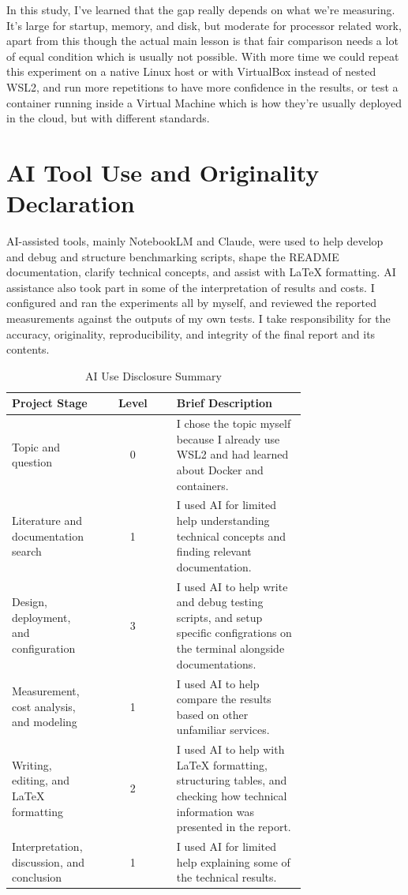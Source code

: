 \documentclass[conference,a4paper]{IEEEtran}
\begin{document}
In this study, I’ve learned that the gap really depends on what we’re measuring. It’s large for startup, memory, and disk, but moderate for processor related work, apart from this though the actual main lesson is that fair comparison needs a lot of equal condition which is usually not possible. With more time we could repeat this experiment on a native Linux host or with VirtualBox instead of nested WSL2, and run more repetitions to have more confidence in the results, or test a container running inside a Virtual Machine which is how they’re usually deployed in the cloud, but with different standards.

\section*{AI Tool Use and Originality Declaration}
\label{sec:ai_declaration}
AI-assisted tools, mainly NotebookLM and Claude, were used to help develop and debug and structure benchmarking scripts, shape the README documentation, clarify technical concepts, and assist with LaTeX formatting. AI assistance also took part in some of the interpretation of results and costs. I configured and ran the experiments all by myself, and reviewed the reported measurements against the outputs of my own tests. I take responsibility for the accuracy, originality, reproducibility, and integrity of the final report and its contents.

\begin{table}[htbp]
	\caption{AI Use Disclosure Summary}
	\label{tab:ai_use}
	\centering
	\footnotesize
	\begin{tabular}{|p{0.30\linewidth}|c|p{0.44\linewidth}|}
		\hline
		\textbf{Project Stage} & \textbf{Level} & \textbf{Brief Description} \\
		\hline
		Topic and question & 0 & I chose the topic myself because I already use WSL2 and had learned about Docker and containers. \\
		\hline
		Literature and documentation search & 1 & I used AI for limited help understanding technical concepts and finding relevant documentation. \\
		\hline
		Design, deployment, and configuration & 3 & I used AI to help write and debug testing scripts, and setup specific configrations on the terminal alongside documentations. \\
		\hline
		Measurement, cost analysis, and modeling & 1 & I used AI to help compare the results based on other unfamiliar services. \\
		\hline
		Writing, editing, and LaTeX formatting & 2 & I used AI to help with LaTeX formatting, structuring tables, and checking how technical information was presented in the report. \\
		\hline
		Interpretation, discussion, and conclusion & 1 & I used AI for limited help explaining some of the technical results. \\
		\hline
	\end{tabular}
\end{table}
\end{document}
